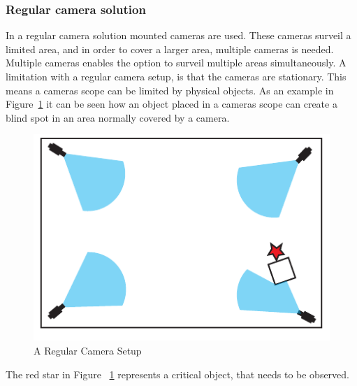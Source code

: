\subsubsection{Regular camera solution}
In a regular camera solution mounted cameras are used.
These cameras surveil a limited area, and in order to cover a larger area, multiple cameras is needed.
Multiple cameras enables the option to surveil multiple areas simultaneously.
A limitation with a regular camera setup, is that the cameras are stationary.
This means a cameras scope can be limited by physical objects.
As an example in Figure~\ref{fig:refular_camera_setup} it can be seen how an object placed in a cameras scope can create a blind spot in an area normally covered by a camera.
\begin{figure}[htb]
    \centering
    \includegraphics[width=\textwidth]{gfx/regular_camera_setup.pdf}
    \caption{A Regular Camera Setup}
    \label{fig:refular_camera_setup}
\end{figure}
The red star in Figure ~\ref{fig:refular_camera_setup} represents a critical object, that needs to be observed.

